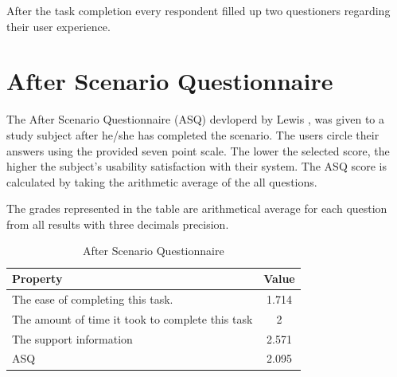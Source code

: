 After the task completion every respondent filled up two questioners regarding their user experience.

\section{After Scenario Questionnaire}
The After Scenario Questionnaire (ASQ) devloperd by Lewis \cite{Lewis}, was given to a study subject after he/she has completed the scenario. The users circle their answers using the provided seven point scale. The lower the selected score, the higher the subject’s usability satisfaction with their system. The ASQ score is calculated by taking the arithmetic average of the all questions.

The grades represented in the table are arithmetical average for each question from all results with three decimals precision. 

\begin{table}[h]
	\begin{center}
		\begin{tabular}{| l | c |}
			\hline
			\textbf{Property} & \textbf{Value }\\
			\hline
			The ease of completing this task. & 1.714 \\
			\hline
			The amount of time it took to complete this task & 2 \\
			\hline
			The support information  & 2.571\\
			\hline
			ASQ & 2.095\\
			\hline
		\end{tabular}
	\end{center}
	\caption{After Scenario Questionnaire}
\end{table}

